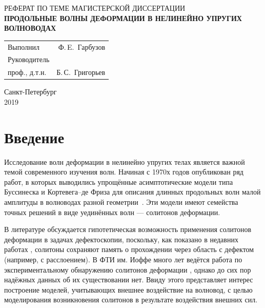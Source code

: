 \documentclass[12pt, a4paper]{article}
\begin{document}
\begin{titlepage}
	
	\begin{center}
		\vspace*{80mm}
		{РЕФЕРАТ ПО ТЕМЕ МАГИСТЕРСКОЙ ДИССЕРТАЦИИ}\\
		\vspace{5mm} 
		{\bf ПРОДОЛЬНЫЕ ВОЛНЫ ДЕФОРМАЦИИ В НЕЛИНЕЙНО УПРУГИХ ВОЛНОВОДАХ}
	\end{center}

	\vspace{45mm}
	\begin{flushleft}
	\begin{tabularx}{\linewidth}{Xr}
		Выполнил & Ф.\,E.~Гарбузов  \\ 
		\vspace{5mm}
		Руководитель &  \\ 
		проф., д.т.н. & Б.\,С.~Григорьев 
	\end{tabularx} 
	\end{flushleft}

	
	\vspace{55mm}
	
	\begin{center}
		Санкт-Петербург\\2019
	\end{center}
	
\end{titlepage}


\section{Введение}
\setcounter{page}{2}

Исследование волн деформации в нелинейно упругих телах
является важной темой современного изучения волн.
Начиная с 1970х годов опубликован ряд работ, в которых выводились упрощённые асимптотические модели типа Буссинеска и Кортевега--де Фриза для описания длинных продольных волн малой амплитуды в волноводах разной геометрии~\cite{OS, NS, S_book, P_book, SP, DC, DF, KSZ}. Эти модели имеют семейства точных решений в виде уединённых волн --- солитонов деформации.

В литературе обсуждается гипотетическая возможность применения солитонов деформации в задачах дефектоскопии, поскольку, как показано в недавних работах \cite{KS, KT1, KT2}, солитоны сохраняют память о прохождении через область с дефектом (например, с расслоением). В ФТИ им. Иоффе много лет ведётся работа по экспериментальному обнаружению солитонов деформации \cite{JAP2010, JAP2012}, однако до сих пор надёжных данных об их существовании нет. Ввиду этого представляет интерес построение моделей, учитывающих внешнее воздействие на волновод, с целью моделирования возникновения солитонов в результате воздействия внешних сил. 
\end{document}
